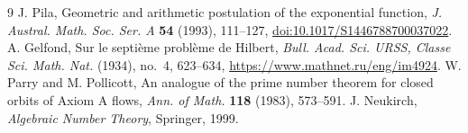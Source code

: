 \documentclass[11pt]{article}
\theoremstyle{remark}\newtheorem{remark}[theorem]{Remark}
\begin{document}
\begin{thebibliography}{9}
J. Pila, Geometric and arithmetic postulation of the exponential function,
\emph{J. Austral. Math. Soc. Ser. A} \textbf{54} (1993), 111--127,
\href{https://doi.org/10.1017/S1446788700037022}{doi:10.1017/S1446788700037022}.
A. Gelfond, Sur le septi\`eme probl\`eme de Hilbert,
\emph{Bull. Acad. Sci. URSS, Classe Sci. Math. Nat.} (1934), no.~4,
623--634, \url{https://www.mathnet.ru/eng/im4924}.
W. Parry and M. Pollicott, An analogue of the prime number theorem for closed
orbits of Axiom A flows, \emph{Ann. of Math.} \textbf{118} (1983), 573--591.
J. Neukirch, \emph{Algebraic Number Theory}, Springer, 1999.
\end{thebibliography}
\end{document}
